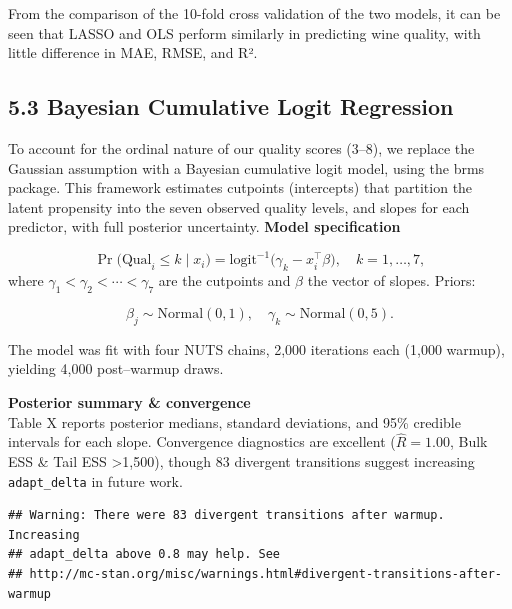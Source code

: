 \documentclass[
  doc,floatsintext]{apa6}
\begin{document}
From the comparison of the 10-fold cross validation of the two models, it can be seen that LASSO and OLS perform similarly in predicting wine quality, with little difference in MAE, RMSE, and R².

\subsection{5.3 Bayesian Cumulative Logit Regression}\label{bayesian-cumulative-logit-regression}

To account for the ordinal nature of our quality scores (3--8), we replace the Gaussian assumption with a Bayesian cumulative logit model, using the brms package. This framework estimates cutpoints (intercepts) that partition the latent propensity into the seven observed quality levels, and slopes for each predictor, with full posterior uncertainty.
\textbf{Model specification}

\[
\Pr\bigl(\text{Qual}_i \le k \mid x_i\bigr)
=\mathrm{logit}^{-1}\bigl(\gamma_k - x_i^\top\beta\bigr),
\quad k = 1,\dots,7,
\]
where \(\gamma_1<\gamma_2<\cdots<\gamma_7\) are the cutpoints and \(\beta\) the vector of slopes. Priors:

\[
\beta_j \sim \mathrm{Normal}(0,1),\quad 
\gamma_k \sim \mathrm{Normal}(0,5).
\]

The model was fit with four NUTS chains, 2,000 iterations each (1,000 warmup), yielding 4,000 post--warmup draws.

\textbf{Posterior summary \& convergence}\\
Table X reports posterior medians, standard deviations, and 95\% credible intervals for each slope. Convergence diagnostics are excellent (\(\widehat R = 1.00\), Bulk ESS \& Tail ESS \textgreater1,500), though 83 divergent transitions suggest increasing \texttt{adapt\_delta} in future work.

\begin{verbatim}
## Warning: There were 83 divergent transitions after warmup. Increasing
## adapt_delta above 0.8 may help. See
## http://mc-stan.org/misc/warnings.html#divergent-transitions-after-warmup
\end{verbatim}
\end{document}
